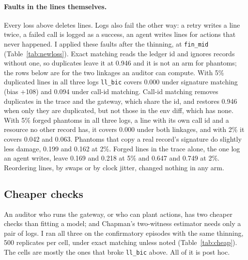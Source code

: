 \documentclass[11pt]{article}
\begin{document}
\paragraph{Faults in the lines themselves.}
Every loss above deletes lines. Logs also fail the other way: a retry writes a line
twice, a failed call is logged as a success, an agent writes lines for actions that
never happened. I applied these faults after the thinning, at \texttt{fin\_mid}
(Table~\ref{tab:newloss}). Exact matching reads the ledger id and ignores records
without one, so duplicates leave it at 0.946 and it is not an arm for phantoms; the
rows below are for the two linkages an auditor can compute. With 5\% duplicated
lines in all three logs \texttt{ll\_bic} covers 0.000 under signature matching (bias
+108) and 0.094 under call-id matching. Call-id matching removes duplicates in the
trace and the gateway, which share the id, and restores 0.946 when only they are
duplicated, but not those in the env diff, which has none. With 5\% forged
phantoms in all three logs, a line with its own call id and a resource no other
record has, it covers 0.000 under both linkages, and with 2\% it covers 0.042 and
0.063. Phantoms that copy a real record's signature do slightly less damage, 0.199
and 0.162 at 2\%. Forged lines in the trace alone, the one log an agent writes,
leave 0.169 and 0.218 at 5\% and 0.647 and 0.749 at 2\%. Reordering lines, by
swaps or by clock jitter, changed nothing in any arm.

\begin{table}[h]
\centering

\caption{Faults in the lines a log wrote, and a drifting loss rate.}
\label{tab:newloss}
\end{table}

\subsection{Cheaper checks}
\label{sec:cheap}

An auditor who runs the gateway, or who can plant actions, has two cheaper checks
than fitting a model; and Chapman's two-witness estimator needs only a pair of
logs. I ran all three on the confirmatory episodes with the same thinning,
500 replicates per cell, under exact matching unless noted (Table~\ref{tab:cheap}).
The cells are mostly the ones that broke \texttt{ll\_bic} above. All of it is post
hoc.
\end{document}
